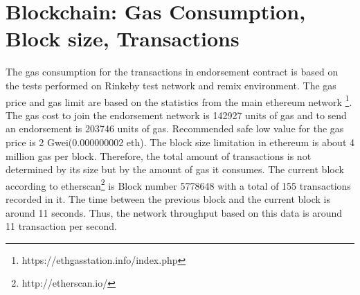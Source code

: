 \section{Blockchain: Gas Consumption, Block size, Transactions}
The gas consumption for the transactions in endorsement contract is based on
the tests performed on Rinkeby test network and remix environment. The gas
price and gas limit are based on the statistics from the main ethereum network
\footnote{https://ethgasstation.info/index.php}. The gas cost to join the
endorsement network is 142927 units of gas and to send an endorsement is 203746
units of gas. Recommended safe low value for the gas price is 2
Gwei(0.000000002 eth). 
The block size limitation in ethereum is about 4 million gas per block.
Therefore, the total amount of transactions is not determined by its size but
by the amount of gas it consumes. The current block according to
etherscan\footnote{http://etherscan.io/} is Block number 5778648 with a total
of 155 transactions recorded in it. The time between the previous block and the
current block is around 11 seconds. Thus, the network throughput based on this
data is around 11 transaction per second. 











